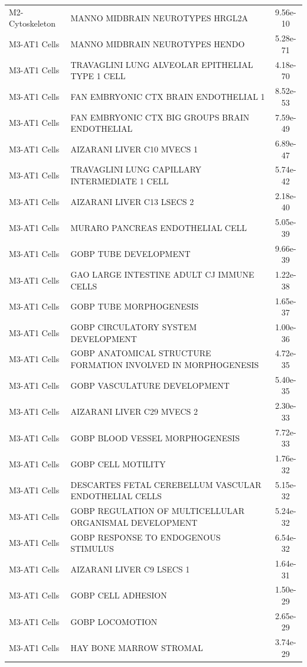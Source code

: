 \documentclass[
]{article}
\begin{document}
\begin{singlespace}
\begin{longtable}[t]{>{\raggedright\arraybackslash}p{1.4in}>{\raggedright\arraybackslash}p{4.5in}c}
M2-Cytoskeleton & MANNO MIDBRAIN NEUROTYPES HRGL2A & 9.56e-10\\
\addlinespace
M3-AT1 Cells & MANNO MIDBRAIN NEUROTYPES HENDO & 5.28e-71\\
M3-AT1 Cells & TRAVAGLINI LUNG ALVEOLAR EPITHELIAL TYPE 1 CELL & 4.18e-70\\
M3-AT1 Cells & FAN EMBRYONIC CTX BRAIN ENDOTHELIAL 1 & 8.52e-53\\
M3-AT1 Cells & FAN EMBRYONIC CTX BIG GROUPS BRAIN ENDOTHELIAL & 7.59e-49\\
M3-AT1 Cells & AIZARANI LIVER C10 MVECS 1 & 6.89e-47\\
\addlinespace
M3-AT1 Cells & TRAVAGLINI LUNG CAPILLARY INTERMEDIATE 1 CELL & 5.74e-42\\
M3-AT1 Cells & AIZARANI LIVER C13 LSECS 2 & 2.18e-40\\
M3-AT1 Cells & MURARO PANCREAS ENDOTHELIAL CELL & 5.05e-39\\
M3-AT1 Cells & GOBP TUBE DEVELOPMENT & 9.66e-39\\
M3-AT1 Cells & GAO LARGE INTESTINE ADULT CJ IMMUNE CELLS & 1.22e-38\\
\addlinespace
M3-AT1 Cells & GOBP TUBE MORPHOGENESIS & 1.65e-37\\
M3-AT1 Cells & GOBP CIRCULATORY SYSTEM DEVELOPMENT & 1.00e-36\\
M3-AT1 Cells & GOBP ANATOMICAL STRUCTURE FORMATION INVOLVED IN MORPHOGENESIS & 4.72e-35\\
M3-AT1 Cells & GOBP VASCULATURE DEVELOPMENT & 5.40e-35\\
M3-AT1 Cells & AIZARANI LIVER C29 MVECS 2 & 2.30e-33\\
\addlinespace
M3-AT1 Cells & GOBP BLOOD VESSEL MORPHOGENESIS & 7.72e-33\\
M3-AT1 Cells & GOBP CELL MOTILITY & 1.76e-32\\
M3-AT1 Cells & DESCARTES FETAL CEREBELLUM VASCULAR ENDOTHELIAL CELLS & 5.15e-32\\
M3-AT1 Cells & GOBP REGULATION OF MULTICELLULAR ORGANISMAL DEVELOPMENT & 5.24e-32\\
M3-AT1 Cells & GOBP RESPONSE TO ENDOGENOUS STIMULUS & 6.54e-32\\
\addlinespace
M3-AT1 Cells & AIZARANI LIVER C9 LSECS 1 & 1.64e-31\\
M3-AT1 Cells & GOBP CELL ADHESION & 1.50e-29\\
M3-AT1 Cells & GOBP LOCOMOTION & 2.65e-29\\
M3-AT1 Cells & HAY BONE MARROW STROMAL & 3.74e-29\\

\end{longtable}
\end{singlespace}
\end{document}
